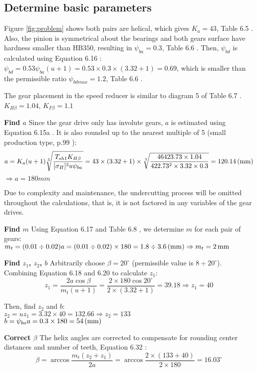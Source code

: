 \subsection{Determine basic parameters}
Figure \ref{fig:problem} shows both pairs are helical, which  gives $ K_a = 43 $, Table 6.5 \cite{tk1}. Also, the pinion is symmetrical about the bearings and both gears surface have hardness smaller than $ \text{HB}350 $, resulting in $ \psi_{ba} = 0.3$, Table 6.6 \cite{tk1}. Then, $ \psi_{bd} $ is calculated using Equation 6.16 \cite{tk1}:\\
$ \psi_{bd} = 0.53\psi_{ba}(u+1) = 0.53\times 0.3\times(3.32+1) = 0.69 $, which is smaller than the permissible ratio $ \psi_{bdmax}=1.2 $, Table 6.6 \cite{tk1}.

The gear placement in the speed reducer is similar to diagram 5 of Table 6.7 \cite{tk1}. $ K_{H\beta} = 1.04 $, $ K_{F\beta} = 1.1 $

\textbf{Find $ a $} Since the gear drive only has involute gears, $ a $ is estimated using Equation 6.15a \cite{tk1}. It is also rounded up to the nearest multiple of 5 (small production type, p.99 \cite{tk1}):
\[a= K_a(u+1)\sqrt[3]{\dfrac{T_{sh1}K_{H\beta}}{[\sigma_H]^2u\psi_{ba}}}	=  43\times(3.32+1)\times\sqrt[3]{\dfrac{46423.73\times 1.04}{422.73^2\times 3.32\times 0.3}}
= 120.14 \, (\mathrm{mm})\]
$ \Rightarrow a= 180 \unit{mm} $

Due to complexity and maintenance, the undercutting process will be omitted throughout the calculations, that is, it is not factored in any variables of the gear drives.

\textbf{Find $ m $} Using Equation 6.17 \cite{tk1} and Table 6.8 \cite{tk1}, we determine $ m $ for each pair of gears:\\
$ m_t = (0.01\div0.02)a = (0.01\div0.02)\times 180 =  1.8 \div 3.6 \, (\mathrm{mm}) \Rightarrow m_t=2\, \mathrm{mm}$

\textbf{Find $ z_1 $, $ z_2 $, $ b $} Arbitrarily choose $ \beta = 20^\circ $ (permissible value is $ 8 \div 20^\circ $). Combining Equation 6.18 and 6.20 \cite{tk1} to calculate $ z_1 $:
\[z_1 = \dfrac{2a\cos\beta}{m_t(u+1)}= \dfrac{2\times 180\cos 20^\circ}{2\times(3.32+1)} = 39.18 \Rightarrow z_1 = 40\]

Then, find $ z_2 $ and $ b $:\\
$ z_2 = uz_1 = 3.32\times 40 = 132.66 \Rightarrow z_2 = 133 $\\
$ b = \psi_{ba}a = 0.3\times 180= 54\, (\mathrm{mm})$

\textbf{Correct $ \beta $} The helix angles are corrected to compensate for rounding center distances and number of teeth, Equation 6.32 \cite{tk1}:
\[\beta = \arccos\dfrac{m_t(z_2+z_1)}{2a} = \arccos\dfrac{2\times(133+40)}{2\times 180} = 16.03 ^\circ\]

